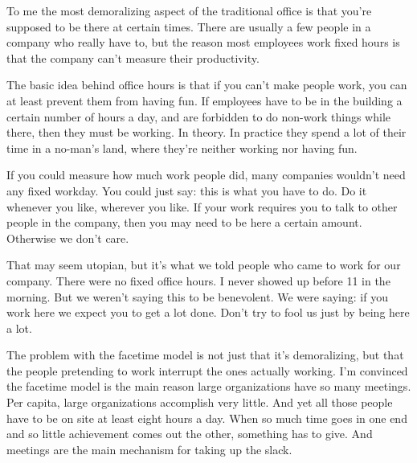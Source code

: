 To me the most
                  demoralizing aspect of the traditional office is that you're
                  supposed to be there at certain times. There are usually a few
                  people in a company who really have to, but the reason most
                  employees work fixed hours is that the company can't measure
                  their productivity.

The basic idea behind office
                  hours is that if you can't make people work, you can at least
                  prevent them from having fun. If employees have to be in the
                  building a certain number of hours a day, and are forbidden to
                  do non-work things while there, then they must be working. In
                  theory. In practice they spend a lot of their time in a
                  no-man's land, where they're neither working nor having
                  fun.

If you could measure how much work people did,
                  many companies wouldn't need any fixed workday. You could just
                  say: this is what you have to do. Do it whenever you like,
                  wherever you like. If your work requires you to talk to other
                  people in the company, then you may need to be here a certain
                  amount. Otherwise we don't care.

That may seem
                  utopian, but it's what we told people who came to work for our
                  company. There were no fixed office hours. I never showed up
                  before 11 in the morning. But we weren't saying this to be
                  benevolent. We were saying: if you work here we expect you to
                  get a lot done. Don't try to fool us just by being here a
                  lot.

The problem with the facetime model is not
                  just that it's demoralizing, but that the people pretending to
                  work interrupt the ones actually working. I'm convinced the
                  facetime model is the main reason large organizations have so
                  many meetings. Per capita, large organizations accomplish very
                  little. And yet all those people have to be on site at least
                  eight hours a day. When so much time goes in one end and so
                  little achievement comes out the other, something has to give.
                  And meetings are the main mechanism for taking up the
                  slack.

